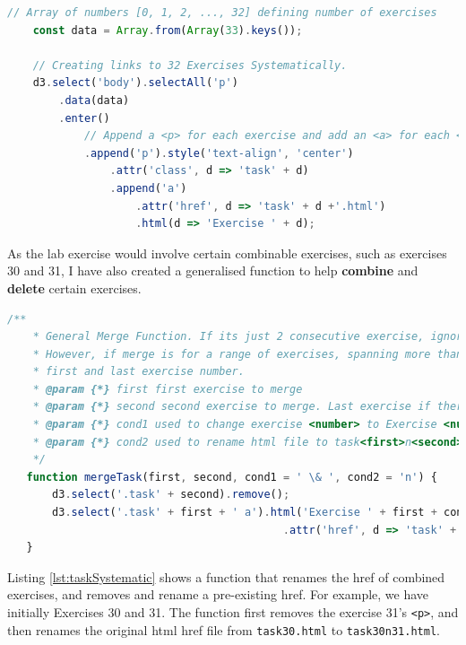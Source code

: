 \documentclass{scrreprt}
\begin{document}
\begin{lstlisting}[language=JavaScript,
                    caption={Systematic URL Creation},
                    captionpos=b,
                    label={lst:urlSystematic}]
    // Array of numbers [0, 1, 2, ..., 32] defining number of exercises
    const data = Array.from(Array(33).keys());

    // Creating links to 32 Exercises Systematically.
    d3.select('body').selectAll('p')
        .data(data)
        .enter()
            // Append a <p> for each exercise and add an <a> for each <p>
            .append('p').style('text-align', 'center')
                .attr('class', d => 'task' + d)
                .append('a')
                    .attr('href', d => 'task' + d +'.html')
                    .html(d => 'Exercise ' + d);
\end{lstlisting}

As the lab exercise would involve certain combinable exercises, such as exercises 30
and 31, I have also created a generalised function to help \textbf{combine} and
\textbf{delete} certain exercises.\\

\begin{lstlisting}[language=JavaScript,
    caption={Systematic URL Removal},
    captionpos=b,
    label={lst:taskSystematic}]
    /**
    * General Merge Function. If its just 2 consecutive exercise, ignore 3rd and 4th parameter. 
    * However, if merge is for a range of exercises, spanning more than 2, only enter the 
    * first and last exercise number.
    * @param {*} first first exercise to merge
    * @param {*} second second exercise to merge. Last exercise if there are more than 2 exercises.
    * @param {*} cond1 used to change exercise <number> to Exercise <number> to <number>
    * @param {*} cond2 used to rename html file to task<first>n<second>.html
    */
   function mergeTask(first, second, cond1 = ' \& ', cond2 = 'n') {
       d3.select('.task' + second).remove();
       d3.select('.task' + first + ' a').html('Exercise ' + first + cond1 + second)
                                           .attr('href', d => 'task' + first + cond2 + second + '.html');
   }
\end{lstlisting}
Listing \ref{lst:taskSystematic} shows a function that renames the href of combined exercises,
and removes and rename a pre-existing href. For example, we have initially Exercises 30 and 31.
The function first removes the exercise 31's \verb|<p>|, and then renames the original html href file
from \verb|task30.html| to \verb|task30n31.html|.\\
\end{document}
